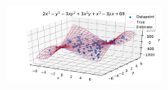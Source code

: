 \documentclass[12pt]{article}
\begin{document}
\begin{figure}[H]
            \includegraphics[width=0.45\textwidth]{f_8_noise3_estplot_regular}
        \end{figure}
    
    
    
    
    
\end{document}
